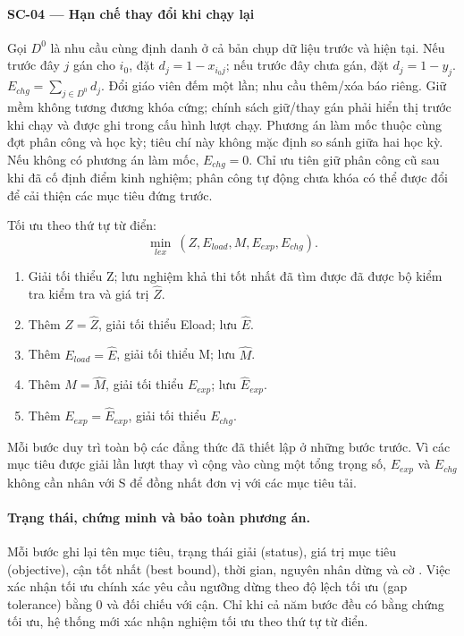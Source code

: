 \documentclass[12pt,a4paper]{report}
\newcommand{\code}[1]{\texttt{\detokenize{#1}}}
\begin{document}
\paragraph{SC-04 --- Hạn chế thay đổi khi chạy lại}
Gọi $D^0$ là nhu cầu cùng định danh ở cả bản chụp dữ liệu trước và hiện tại.
Nếu trước đây $j$ gán cho $i_0$, đặt $d_j=1-x_{i_0j}$; nếu trước đây chưa
gán, đặt $d_j=1-y_j$. $E_{chg}=\sum_{j\in D^0}d_j$. Đổi giáo viên đếm một
lần; nhu cầu thêm/xóa báo riêng. Giữ mềm không tương đương khóa cứng; chính
sách giữ/thay gán phải hiển thị trước khi chạy và được ghi trong cấu hình lượt chạy. Phương án làm mốc thuộc cùng đợt phân công và học kỳ; tiêu chí này không mặc định so sánh giữa hai học kỳ. Nếu không có phương án làm mốc, $E_{chg}=0$. Chỉ ưu tiên giữ phân công cũ sau khi đã cố định điểm kinh nghiệm; phân công tự động chưa khóa có thể được đổi để cải thiện các mục tiêu đứng trước.


Tối ưu theo thứ tự từ điển:
\[
\min_{lex}\ (Z,E_{load},M,E_{exp},E_{chg}).
\]
\begin{enumerate}
\item Giải tối thiểu Z; lưu nghiệm khả thi tốt nhất đã tìm được đã được bộ kiểm tra kiểm tra và giá trị $\widehat Z$.
\item Thêm $Z=\widehat Z$, giải tối thiểu Eload; lưu $\widehat E$.
\item Thêm $E_{load}=\widehat E$, giải tối thiểu M; lưu $\widehat M$.
\item Thêm $M=\widehat M$, giải tối thiểu $E_{exp}$; lưu $\widehat E_{exp}$.
\item Thêm $E_{exp}=\widehat E_{exp}$, giải tối thiểu $E_{chg}$.
\end{enumerate}
Mỗi bước duy trì toàn bộ các đẳng thức đã thiết lập ở những bước trước. Vì các mục tiêu được giải lần lượt thay vì cộng vào cùng một tổng trọng số, $E_{exp}$ và $E_{chg}$ không cần nhân với S để đồng nhất đơn vị với các mục tiêu tải.

\paragraph{Trạng thái, chứng minh và bảo toàn phương án.}
Mỗi bước ghi lại tên mục tiêu, trạng thái giải (status), giá trị mục tiêu (objective), cận tốt nhất (best bound), thời gian, nguyên nhân dừng và cờ \code{exactOptimalityProven}. Việc xác nhận tối ưu chính xác yêu cầu ngưỡng dừng theo độ lệch tối ưu (gap tolerance) bằng 0 và đối chiếu với cận. Chỉ khi cả năm bước đều có bằng chứng tối ưu, hệ thống mới xác nhận nghiệm tối ưu theo thứ tự từ điển.
\end{document}
